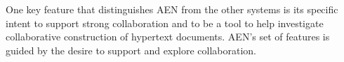 One key feature that distinguishes AEN from the other systems is its
specific intent to support strong collaboration and to be a tool to help
investigate collaborative construction of hypertext documents.  AEN's set of
features is guided by the desire to support and explore collaboration.













